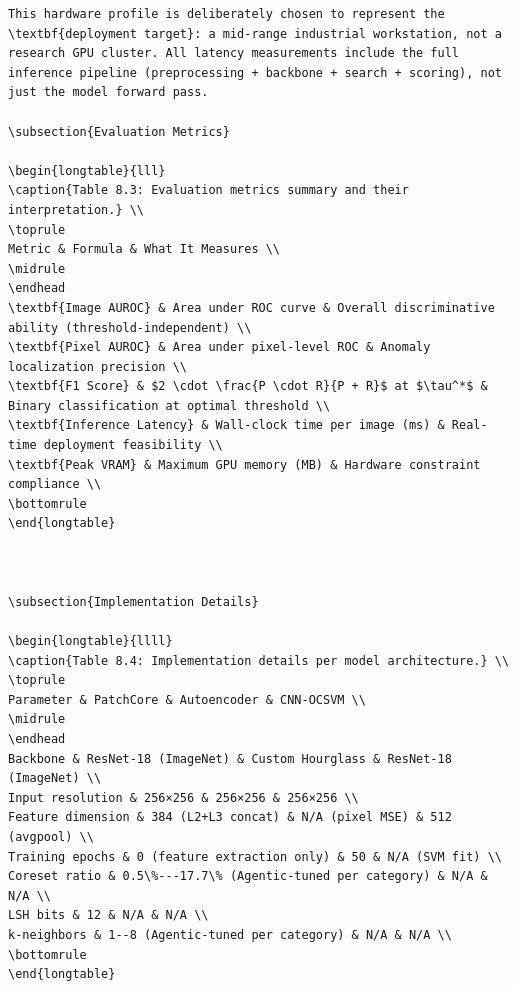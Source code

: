 \documentclass[12pt,a4paper,oneside]{report}
\begin{document}
\begin{verbatim}
This hardware profile is deliberately chosen to represent the \textbf{deployment target}: a mid-range industrial workstation, not a research GPU cluster. All latency measurements include the full inference pipeline (preprocessing + backbone + search + scoring), not just the model forward pass.

\subsection{Evaluation Metrics}

\begin{longtable}{lll}
\caption{Table 8.3: Evaluation metrics summary and their interpretation.} \\
\toprule
Metric & Formula & What It Measures \\
\midrule
\endhead
\textbf{Image AUROC} & Area under ROC curve & Overall discriminative ability (threshold-independent) \\
\textbf{Pixel AUROC} & Area under pixel-level ROC & Anomaly localization precision \\
\textbf{F1 Score} & $2 \cdot \frac{P \cdot R}{P + R}$ at $\tau^*$ & Binary classification at optimal threshold \\
\textbf{Inference Latency} & Wall-clock time per image (ms) & Real-time deployment feasibility \\
\textbf{Peak VRAM} & Maximum GPU memory (MB) & Hardware constraint compliance \\
\bottomrule
\end{longtable}



\subsection{Implementation Details}

\begin{longtable}{llll}
\caption{Table 8.4: Implementation details per model architecture.} \\
\toprule
Parameter & PatchCore & Autoencoder & CNN-OCSVM \\
\midrule
\endhead
Backbone & ResNet-18 (ImageNet) & Custom Hourglass & ResNet-18 (ImageNet) \\
Input resolution & 256×256 & 256×256 & 256×256 \\
Feature dimension & 384 (L2+L3 concat) & N/A (pixel MSE) & 512 (avgpool) \\
Training epochs & 0 (feature extraction only) & 50 & N/A (SVM fit) \\
Coreset ratio & 0.5\%---17.7\% (Agentic-tuned per category) & N/A & N/A \\
LSH bits & 12 & N/A & N/A \\
k-neighbors & 1--8 (Agentic-tuned per category) & N/A & N/A \\
\bottomrule
\end{longtable}




\end{verbatim}
\end{document}
